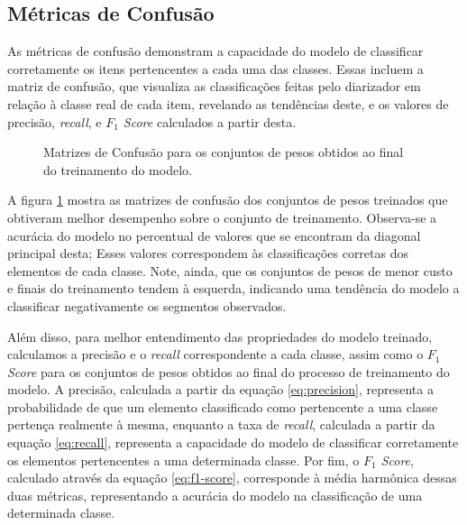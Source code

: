 \subsection{Métricas de Confusão}
\label{sec:results-model-confusion}

As métricas de confusão demonstram a capacidade do modelo de classificar corretamente os itens pertencentes a cada uma das classes.
Essas incluem a matriz de confusão, que visualiza as classificações feitas pelo diarizador em relação à classe real de cada item, revelando as tendências deste, e os valores de precisão, \textit{recall}, e \textit{$F_1$ Score} calculados a partir desta.

\begin{figure}[ht]
    \centering
    \caption{Matrizes de Confusão para os conjuntos de pesos obtidos ao final \\ do treinamento do modelo. }
    \label{fig:confusion_matrices}
\end{figure}

A figura \ref{fig:confusion_matrices} mostra as matrizes de confusão dos conjuntos de pesos treinados que obtiveram melhor desempenho sobre o conjunto de treinamento.
Observa-se a acurácia do modelo no percentual de valores que se encontram da diagonal principal desta; Esses valores correspondem às classificações corretas dos elementos de cada classe.
Note, ainda, que os conjuntos de pesos de menor custo e finais do treinamento tendem à esquerda, indicando uma tendência do modelo a classificar negativamente os segmentos observados.

Além disso, para melhor entendimento das propriedades do modelo treinado, calculamos a precisão e o \textit{recall} correspondente a cada classe, assim como o \textit{$F_1$ Score} para os conjuntos de pesos obtidos ao final do processo de treinamento do modelo.
A precisão, calculada a partir da equação \ref{eq:precision}, representa a probabilidade de que um elemento classificado como pertencente a uma classe pertença realmente à mesma, enquanto a taxa de \textit{recall}, calculada a partir da equação \ref{eq:recall}, representa a capacidade do modelo de classificar corretamente os elementos pertencentes a uma determinada classe.
Por fim, o \textit{$F_1$ Score}, calculado através da equação \ref{eq:f1-score}, corresponde à média harmônica dessas duas métricas, representando a acurácia do modelo na classificação de uma determinada classe.

